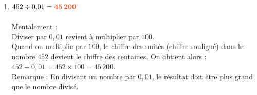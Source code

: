 \documentclass[10pt,a4paper]{article}
\begin{document}
\begin{enumerate}[itemsep=1em]
{  Diviser par $0,001$ revient à multiplier par $1000$. \\
  Quand on multiplie par $1000$, le chiffre des unités (chiffre souligné) dans le nombre  $14\underline{2}$
  devient le chiffre des unités de mille. On obtient alors :\\
  $142\div 0{,}001=142\times 1000=14\underline{2}\,000$.\\
  Remarque : En divisant un nombre par $0,001$, le résultat doit être plus grand que le nombre divisé.
     }
	\item $452\div 0{,}01={\color[HTML]{f15929}\boldsymbol{45\,200}}$\\{\color[HTML]{216D9A}\\ Mentalement : \\
  Diviser par $0,01$ revient à multiplier par $100$. \\
  Quand on multiplie par $100$, le chiffre des unités (chiffre souligné) dans le nombre  $45\underline{2}$
  devient le chiffre des centaines. On obtient alors :\\
  $452\div 0{,}01=452\times 100=45\,\underline{2}00$.\\
  Remarque : En divisant un nombre par $0,01$, le résultat doit être plus grand que le nombre divisé.
     }
\end{enumerate}
 
\end{document}
